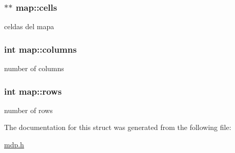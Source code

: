 \subsubsection[{\texorpdfstring{cells}{cells}}]{$\ast$$\ast$ map\+::cells}\hypertarget{structmap_a8aeb7b72916950e546c70ec3567c2e21}{}\label{structmap_a8aeb7b72916950e546c70ec3567c2e21}
celdas del mapa 
\subsubsection[{\texorpdfstring{columns}{columns}}]{\setlength{\rightskip}{0pt plus 5cm}int map\+::columns}\hypertarget{structmap_a8519a22ad01493b189ad4ee64eb5b7dc}{}\label{structmap_a8519a22ad01493b189ad4ee64eb5b7dc}
number of columns 
\subsubsection[{\texorpdfstring{rows}{rows}}]{\setlength{\rightskip}{0pt plus 5cm}int map\+::rows}\hypertarget{structmap_a2ee828fe96a115fe070e8ff8eea7b488}{}\label{structmap_a2ee828fe96a115fe070e8ff8eea7b488}
number of rows 

The documentation for this struct was generated from the following file\+:\begin{DoxyCompactItemize}
\item 
\hyperlink{mdp_8h}{mdp.\+h}\end{DoxyCompactItemize}

